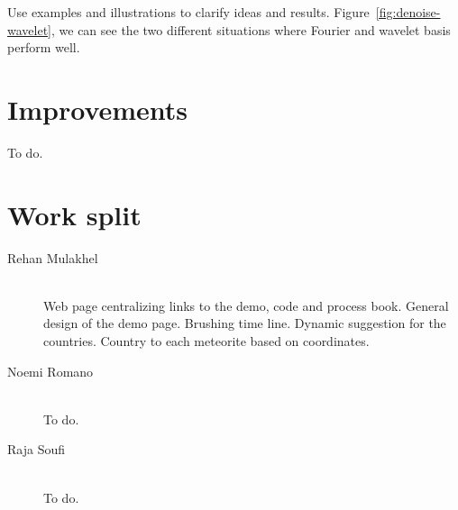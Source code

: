 \documentclass[10pt,conference,compsocconf]{IEEEtran}
\begin{document}
Use examples and illustrations to clarify ideas and results. Figure~\ref{fig:denoise-wavelet}, we can see the two different situations where Fourier and wavelet basis perform well.

\section{Improvements}
\label{sec:improvements}

To do.

\section{Work split}
\label{sec:work_split}

\begin{description}
\item[Rehan Mulakhel] \ \\
  Web page centralizing links to the demo, code and process book. General design of the demo page. Brushing time line. Dynamic suggestion for the countries. Country to each meteorite based on coordinates.
\item[Noemi Romano] \ \\
  To do.
\item[Raja Soufi] \ \\
  To do.
\end{description}
\end{document}
